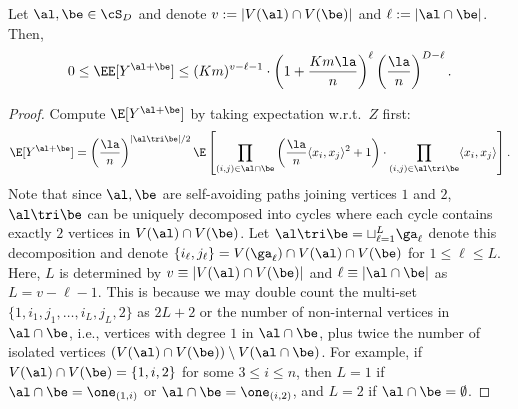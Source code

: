 \documentclass[11pt]{article}
\begin{document}
\begin{lemma}\label{lem:compute:Y:al:plus:be}
Let $\al,\be\in \cS_D$ and denote $v:=|V(\al)\cap V(\be)|$ and $\ell:=|\al\cap \be|$. Then,
\[
0\leq \EE[Y^{\al+\be}]\leq (Km)^{v-\ell-1}\cdot \left(1+\frac{Km\la}{n}\right)^{\ell}\left(\frac{\la}{n}\right)^{D-\ell}.
\]
\end{lemma}
\begin{proof}
Compute $\E[Y^{\al+\be}]$ by taking expectation w.r.t.\ $Z$ first:
\begin{equation}\label{eq:compute:Y:al:be}
\E[Y^{\al+\be}]=\left(\frac{\la}{n}\right)^{|\al\tri \be|/2}\E\left[\prod_{(i,j)\in \al\cap \be}\left(\frac{\la}{n}\langle x_i,x_j\rangle^2+1\right)\cdot\prod_{(i,j)\in \al\tri\be}\langle x_i,x_j\rangle\right].   
\end{equation}
Note that since $\al,\be$ are self-avoiding paths joining vertices $1$ and $2$, $\al\tri \be$ can be uniquely decomposed into cycles where each cycle contains exactly $2$ vertices in $V(\al)\cap V(\be)$. Let $\al \tri \be =\sqcup_{\ell=1}^{L} \ga_\ell$ denote this decomposition and denote $\{i_{\ell},j_{\ell}\}= V(\ga_\ell)\cap V(\al)\cap V(\be)$ for $1\leq \ell \leq L$. Here, $L$ is determined by $v\equiv |V(\al)\cap V(\be)|$ and $\ell\equiv |\al\cap \be|$ as $L=v-\ell-1$. This is because we may double count the multi-set $\{1,i_1,j_1,\ldots, i_L,j_L, 2\}$ as $2L+2$ or the number of non-internal vertices in $\al\cap \be$, i.e., vertices with degree $1$ in $\al\cap\be$, plus twice the number of isolated vertices $(V(\al)\cap V(\be))\setminus V(\al\cap \be)$. For example, if $V(\al)\cap V(\be)=\{1,i,2\}$ for some $3\leq i\leq n$, then $L=1$ if $\al\cap \be = \one_{(1,i)}$ or $\al\cap \be=\one_{(i,2)}$, and $L=2$ if $\al\cap \be=\emptyset$. 


\end{proof}
\end{document}

